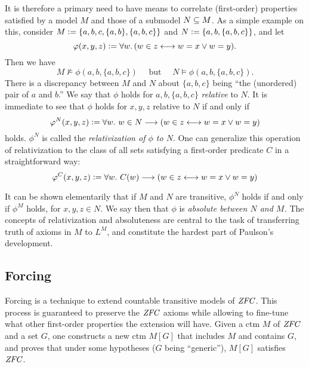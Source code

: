 It is therefore a primary need to have means to correlate  (first-order)
properties satisfied by a model $M$ and those of a 
submodel $N\subseteq M$. As a simple example on this, consider 
$M\mathrel{\mathop:}= \{a,b,c, \{a,b\},\{a,b,c\}\}$ and
$N\mathrel{\mathop:}=\{a,b,\{a,b,c\}\}$, and let 
\[
\varphi(x,y,z)\mathrel{\mathop:}= \forall w.\,( w\in z \longleftrightarrow w=x \vee w=y).
\]
Then we have
\[
M\not\models \phi(a,b,\{a,b,c\}) \quad\text{ but }\quad N\models \phi(a,b,\{a,b,c\}).
\]
There is a discrepancy between  $M$ and $N$ about $\{a,b,c\}$ being ``the
(unordered) pair of $a$ and $b$.'' We say that $\phi$ holds for
$a,b,\{a,b,c\}$ \emph{relative} to $N$. It is immediate to see that
$\phi$ holds  for $x,y,z$ relative to $N$ if and only if
\[
\varphi^N(x,y,z)\mathrel{\mathop:}= \forall w.\ w\in N\longrightarrow ( w\in z \longleftrightarrow w=x \vee w=y)
\] 
holds. $\phi^N$ is called the \emph{relativization of $\phi$ to
  $N$}. One can generalize this operation of relativization to the
class of all sets satisfying a first-order predicate $C$ in a
straightforward way:
\[
\varphi^C(x,y,z)\mathrel{\mathop:}= \forall w.\ C(w)\longrightarrow ( w\in z \longleftrightarrow w=x \vee w=y)
\] 

It can be shown elementarily that if $M$ and $N$ are transitive,
$\phi^N$ holds if and only if $\phi^M$ holds,  for $x,y,z\in N$. We
say then that $\phi$ is \emph{absolute between $N$ and $M$.}
The concepts of relativization and absoluteness are central to the
task of transferring truth of axioms in $M$ to $L^M$, and constitute
the hardest part of Paulson's development.


\subsection{Forcing}
Forcing is a technique to extend countable transitive models of
$\mathit{ZFC}$. This process is guaranteed to preserve the $\mathit{ZFC}$
axioms while allowing to fine-tune what other first-order properties the
extension will have. Given a ctm $M$  of $\mathit{ZFC}$ and a set $G$, one constructs a new
ctm  $M[G]$  that includes $M$ and
contains $G$, and proves that under some hypotheses ($G$ being ``generic''),
$M[G]$ satisfies $\mathit{ZFC}$.

